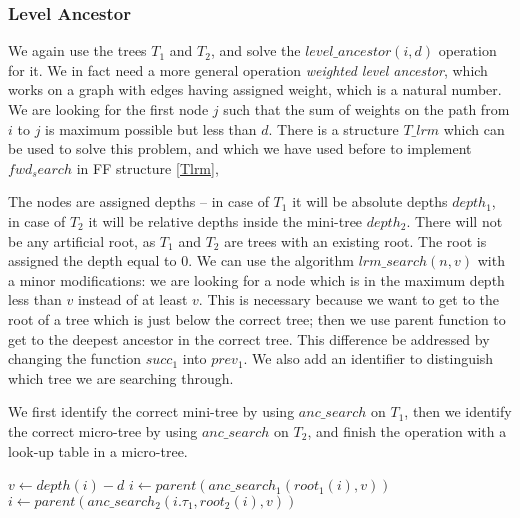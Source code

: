 \subsubsection{Level Ancestor}

We again use the trees $T_1$ and $T_2$, and solve the $level\_ancestor(i, d)$ operation for it.
We in fact need a more general operation \emph{weighted level ancestor}, which works on a graph with edges having assigned weight, which is a natural number.
We are looking for the first node $j$ such that the sum of weights on the path from $i$ to $j$ is maximum possible but less than $d$.
There is a structure $T\_{lrm}$ which can be used to solve this problem, and which we have used before to implement $fwd_search$ in FF structure \ref{Tlrm},

The nodes are assigned depths -- in case of $T_1$ it will be absolute depths $depth_1$, in case of $T_2$ it will be relative depths inside the mini-tree $depth_2$.
There will not be any artificial root, as $T_1$ and $T_2$ are trees with an existing root.
The root is assigned the depth equal to $0$.
We can use the algorithm $lrm\_search(n, v)$ with a minor modifications: we are looking for a node which is in the maximum depth less than $v$ instead of at least $v$.
This is necessary because we want to get to the root of a tree which is just below the correct tree; then we use parent function to get to the deepest ancestor in the correct tree.
This difference be addressed by changing the function $succ_1$ into $prev_1$.
We also add an identifier to distinguish which tree we are searching through.

We first identify the correct mini-tree by using $anc\_search$ on $T_1$, then we identify the correct micro-tree by using $anc\_search$ on $T_2$, and finish the operation with a look-up table in a micro-tree.

\begin{algorithm}
\begin{algorithmic}
	\State $v \gets depth(i) - d$
		\State {}
	\EndIf
	 
		\State $i \gets parent(anc\_search_1(root_1(i), v))$
	\EndIf
	 
		\State $i \gets parent(anc\_search_2(i.\tau_1, root_2(i), v))$
	\EndIf
	\State {}
\EndFunction
\end{algorithmic}
\end{algorithm}

